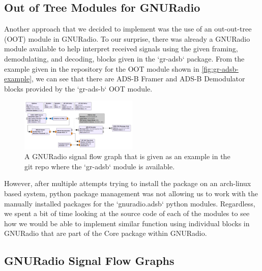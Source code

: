 \documentclass[conference]{IEEEtran}
\begin{document}
\subsection{Out of Tree Modules for GNURadio}
Another approach that we decided to implement was the use of an out-out-tree (OOT) module \cite{oot-adsb} in GNURadio.
To our surprise, there was already a GNURadio module available to help interpret received signals using the given framing, demodulating, and decoding, blocks given in the `gr-adsb` package.
From the example given in the repository for the OOT module shown in \autoref{fig:gr-adsb-example}, we can see that there are ADS-B Framer and ADS-B Demodulator blocks provided by the `gr-ads-b` OOT module. 

\begin{figure}
  \begin{center}
    \includegraphics[width=0.5\textwidth]{./figures/adsb_rx.png}
  \end{center}
  \caption{A GNURadio signal flow graph that is given as an example in the git repo where the `gr-adsb` module is available.}\label{fig:gr-adsb-example}
\end{figure}

However, after multiple attempts trying to install the package on an arch-linux based system, python package management was not allowing us to work with the manually installed packages for the `gnuradio.adsb` python modules.
Regardless, we spent a bit of time looking at the source code of each of the modules to see how we would be able to implement similar function using individual blocks in GNURadio that are part of the Core package within GNURadio.






\subsection{GNURadio Signal Flow Graphs}


\end{document}

